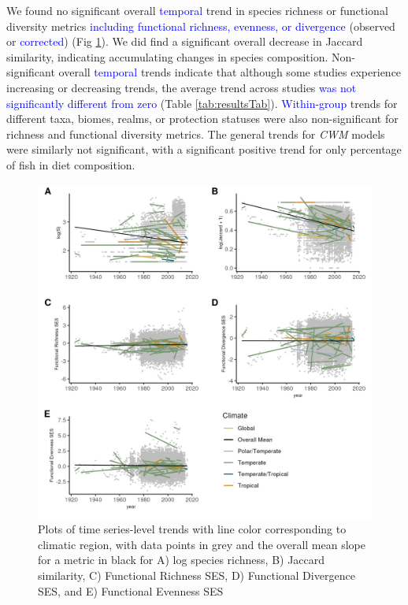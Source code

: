 \documentclass{article}
\begin{document}
We found no significant overall \textcolor{blue}{temporal} trend in
species richness or functional diversity metrics
\textcolor{blue}{including functional richness, evenness, or divergence}
(observed or \textcolor{blue}{corrected}) (Fig
\ref{fig:timeseriesPlot}). We did find a significant overall decrease in
Jaccard similarity, indicating accumulating changes in species
composition. Non-significant overall \textcolor{blue}{temporal} trends
indicate that although some studies experience increasing or decreasing
trends, the average trend across studies
\textcolor{blue}{was not significantly different from zero} (Table
\ref{tab:resultsTab}). \textcolor{blue}{Within-group} trends for
different taxa, biomes, realms, or protection statuses were also
non-significant for richness and functional diversity metrics. The
general trends for \emph{CWM} models were similarly not significant,
with a significant positive trend for only percentage of fish in diet
composition.

\begin{figure}
\includegraphics[width=\textwidth]{../../figures/3met_long} \caption{Plots of time series-level trends with line color corresponding to climatic region, with data points in grey and the overall mean slope for a metric in black for A) log species richness, B) Jaccard similarity, C) Functional Richness SES, D) Functional Divergence SES, and E) Functional Evenness SES}\label{fig:timeseriesPlot}
\end{figure}
\end{document}
